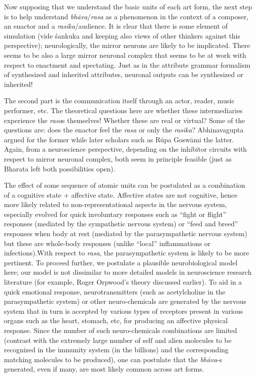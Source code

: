 Now supposing that we understand the basic units of each art form, the next step is to help understand \textsl{bhāva}/\textsl{rasa} as a phenomenon in the context of a composer, an enactor and a \textsl{rasika}/audience. It is clear that there is some element of simulation (vide śankuka and keeping also views of other thinkers against this perspective); neurologically, the mirror neurons are likely to be implicated. There seems to be also a large mirror neuronal complex that seems to be at work with respect to enactment and spectating. Just as in the attribute grammar formalism of synthesized and inherited attributes, neuronal outputs can be synthesized or inherited!

The second part is the communication itself through an actor, reader, music performer, etc. The theoretical questions here are whether these intermediaries experience the \textsl{rasa}s themselves! Whether these are real or virtual? Some of the questions are: does the enactor feel the \textsl{rasa} or only the \textsl{rasika}? Abhinavagupta argued for the former while later scholars such as Rūpa Goswāmi the latter. Again, from a neuroscience perspective, depending on the inhibitor circuits with respect to mirror neuronal complex, both seem in principle feasible (just as Bharata left both possibilities open).

The effect of some sequence of atomic units can be postulated as a combination of a cognitive state + affective state. Affective states are not cognitive, hence more likely related to non-representational aspects in the nervous system, especially evolved for quick involuntary responses such as “fight or flight” responses (mediated by the sympathetic nervous system) or “feed and breed” responses when body at rest (mediated by the parasympathetic nervous system) but these are whole-body responses (unlike “local” inflammations or infections).\break With respect to \textsl{rasa}, the parasympathetic system is likely to be more pertinent. To proceed further, we postulate a plausible neurobiological model here; our model is not dissimilar to more detailed models in neuroscience research literature (for example, Roger Orpwood’s theory discussed earlier). To aid in a quick emotional response, neurotransmitters (such as acetylcholine in the parasympathetic system) or other neuro-chemicals are generated by the nervous system that in turn is accepted by various types of receptors present in various organs such as the heart, stomach, etc, for producing an affective physical response. Since the number of such neuro-chemicals combinations are limited (contrast with the extremely large number of self and alien molecules to be recognized in the immunity system (in the billions) and the corresponding matching molecules to be produced), one can postulate that the \textsl{bhāva}-s generated, even if many, are most likely common across art forms. 

